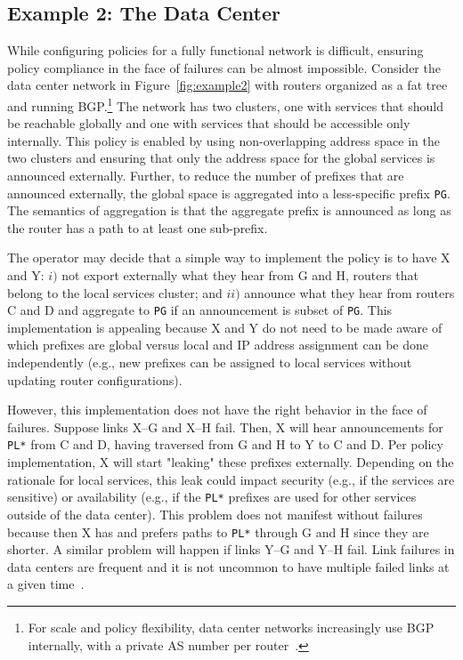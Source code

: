 \documentclass[10pt]{sigalternate052015}
\newcommand{\CD}[1]{\texttt{\small #1}}  %
\begin{document}
\subsection{Example 2:  The Data Center}

 While configuring policies for a fully functional network is difficult, ensuring policy compliance in the face of failures can be almost impossible. Consider the data center network in Figure~\ref{fig:example2} with routers organized as a fat tree and running BGP.\footnote{For scale and policy flexibility, data center networks increasingly use BGP internally, with a private AS number per router~\cite{bgp-in-dc}.} The network has two clusters, one with services that should be reachable globally and one with services that should be accessible only internally. This policy is enabled by using non-overlapping address space in the two clusters and ensuring that only the address space for the global services is announced externally. Further, to reduce the number of prefixes that are announced externally, the global space is aggregated into a less-specific prefix \CD{PG}. The semantics of aggregation is that the aggregate prefix is announced as long as the router has a path to at least one sub-prefix.

The operator may decide that a simple way to implement the policy is to have X and Y: $i)$ not export externally what they hear from G and H, routers that belong to the local services cluster; and $ii)$ announce what they hear from routers C and D and aggregate to \CD{PG} if an announcement is subset of \CD{PG}. This implementation is appealing because X and Y do not need to be made aware of which prefixes are global versus local and IP address assignment can be done independently (e.g., new prefixes can be assigned to local services without updating router configurations).


However, this implementation does not have the right behavior in the face of failures. Suppose links X--G and X--H fail. Then, X will hear announcements for \CD{PL*} from C and D, having traversed from G and H to Y to C and D. Per policy implementation, X will start "leaking" these prefixes externally. Depending on the rationale for local services, this leak could impact security (e.g., if the services are sensitive) or availability (e.g., if the \CD{PL*} prefixes are used for other services outside of the data center). This problem does not manifest without failures because then X has and prefers paths to \CD{PL*} through G and H since they are shorter. A similar problem will happen if links Y--G and Y--H fail.
Link failures in data centers are frequent and it is not uncommon to have multiple failed links at a given time~\cite{dc-failure-study}.
\end{document}
